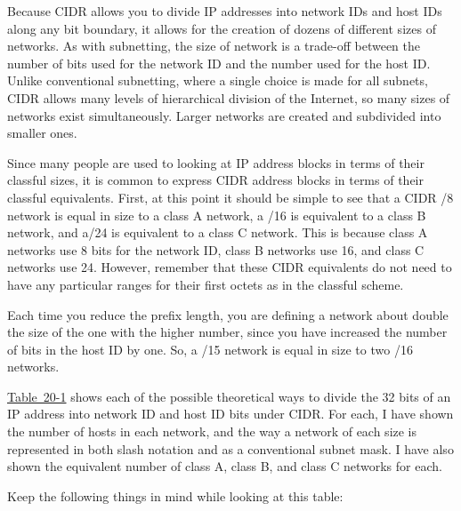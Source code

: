 \documentclass[b5paper,11pt]{memoir}
\begin{document}
\protect\hypertarget{ch20s03.html}{}{}

Because CIDR allows you to divide IP addresses into network IDs and host
IDs along any bit boundary, it allows for the creation of dozens of
different sizes of networks. As with subnetting, the size of network is
a trade-off between the number of bits used for the network ID and the
number used for the host ID. Unlike conventional subnetting, where a
single choice is made for all subnets, CIDR allows many levels of
hierarchical division of the Internet, so many sizes of networks exist
simultaneously. Larger networks are created and subdivided into smaller
ones.

Since many people are used to looking at IP address
\protect\hypertarget{ch20s03.htmlux5cux23idx-CHP-20-0770}{}{}blocks in
terms of their classful sizes, it is common to express CIDR address
blocks in terms of their classful equivalents. First, at this point it
should be simple to see that a CIDR /8 network is equal in size to a
class A network, a /16 is equivalent to a class B network, and a/24 is
equivalent to a class C network. This is because class A networks use 8
bits for the network ID, class B networks use 16, and class C networks
use 24. However, remember that these CIDR equivalents do not need to
have any particular ranges for their first octets as in the classful
scheme.

Each time you reduce the prefix length, you are defining a network about
double the size of the one with the higher number, since you have
increased the number of bits in the host ID by one. So, a /15 network is
equal in size to two /16 networks.

\protect\hyperlink{ch20s03.htmlux5cux23cidr_address_blocks_and_classful_address}{Table~20-1}
shows each of the possible theoretical ways to divide the 32 bits of an
IP address into network ID and host ID bits under CIDR. For each, I have
shown the number of hosts in each network, and the way a network of each
size is represented in both slash notation and as a conventional subnet
mask. I have also shown the equivalent number of class A, class B, and
class C networks for each.

Keep the following things in mind while looking at this table:
\end{document}
